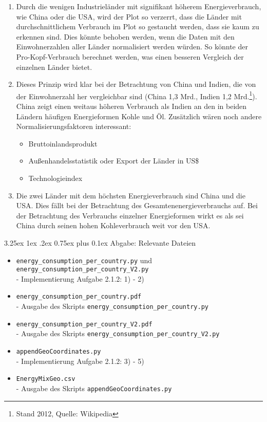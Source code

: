 \documentclass[12pt,a4paper]{scrartcl}
\makeatletter
\renewcommand\subparagraph{\@startsection{subparagraph}{5}{\parindent}%
    {3.25ex \@plus1ex \@minus .2ex}%
    {0.75ex plus 0.1ex}%
    {\normalfont\normalsize\bfseries}}
\makeatother
\begin{document}
\begin{enumerate}
\item Durch die wenigen Industriel\"ander mit signifikant h\"oherem Energieverbrauch, wie China oder die USA, wird der Plot so verzerrt, dass die L\"ander mit durchschnittlichem Verbrauch im Plot so gestaucht werden, dass sie kaum zu erkennen sind. Dies k\"onnte behoben werden, wenn die Daten mit den Einwohnerzahlen aller L\"ander normalisiert werden w\"urden. So k\"onnte der Pro-Kopf-Verbrauch berechnet werden, was einen besseren Vergleich der einzelnen L\"ander bietet.
\item Dieses Prinzip wird klar bei der Betrachtung von China und Indien, die von der Einwohnerzahl her vergleichbar sind (China 1,3 Mrd., Indien 1,2 Mrd.\footnote{Stand 2012, Quelle: Wikipedia}). China zeigt einen weitaus h\"oheren Verbrauch als Indien an den in beiden L\"andern h\"aufigen Energieformen Kohle und \"Ol.
Zus\"atzlich w\"aren noch andere Normalisierungsfaktoren interessant:
\begin{itemize}
\item Bruttoinlandsprodukt
\item Au\ss enhandelsstatistik oder Export der L\"ander in US\$
\item Technologieindex
\end{itemize}
\item Die zwei L\"ander mit dem h\"ochsten Energieverbrauch sind China und die USA. Dies f\"allt bei der Betrachtung des Gesamtenenergieverbrauchs auf. Bei der Betrachtung des Verbrauchs einzelner Energieformen wirkt es als sei China durch seinen hohen Kohleverbrauch weit vor den USA.
\end{enumerate}

\subparagraph{Abgabe: Relevante Dateien}
\begin{itemize}
\item \lstinline{energy_consumption_per_country.py} und \lstinline{energy_consumption_per_country_V2.py} \\- Implementierung Aufgabe 2.1.2: 1) - 2)
\item \lstinline{energy_consumption_per_country.pdf} \\- Ausgabe des Skripts \lstinline{energy_consumption_per_country.py} 
\item \lstinline{energy_consumption_per_country_V2.pdf} \\- Ausgabe des Skripts \lstinline{energy_consumption_per_country_V2.py}
\item \lstinline{appendGeoCoordinates.py} \\- Implementierung Aufgabe 2.1.2: 3) - 5)
\item \lstinline|EnergyMixGeo.csv|  \\- Ausgabe des Skripts \lstinline{appendGeoCoordinates.py}
\end{itemize}
\end{document}
